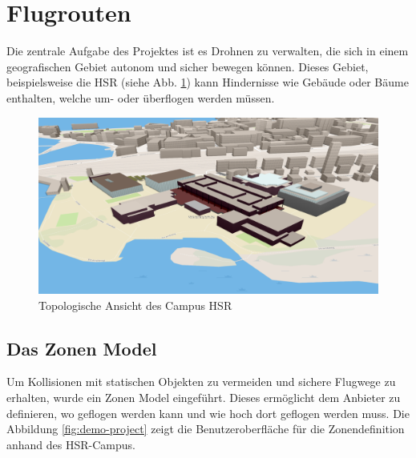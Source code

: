 \newpage
\section{Flugrouten}
Die zentrale Aufgabe des Projektes ist es Drohnen zu verwalten, die sich in einem geografischen Gebiet autonom und sicher bewegen können. 
Dieses Gebiet, beispielsweise die HSR (siehe Abb. \ref{fig:campus-hsr}) kann Hindernisse wie Gebäude oder Bäume enthalten, welche um- oder überflogen werden müssen. \\

\begin{figure}[H]
	\includegraphics[width=1.0\textwidth]{images/routing/topology_example.png}
	\caption{Topologische Ansicht des Campus HSR}
	\label{fig:campus-hsr}
\end{figure}

\subsection{Das Zonen Model}
Um Kollisionen mit statischen Objekten zu vermeiden und sichere Flugwege zu erhalten, wurde ein Zonen Model eingeführt. Dieses ermöglicht dem Anbieter zu definieren, wo geflogen werden kann und wie hoch dort geflogen werden muss. Die Abbildung \ref{fig:demo-project} zeigt die Benutzeroberfläche für die Zonendefinition anhand des HSR-Campus.

